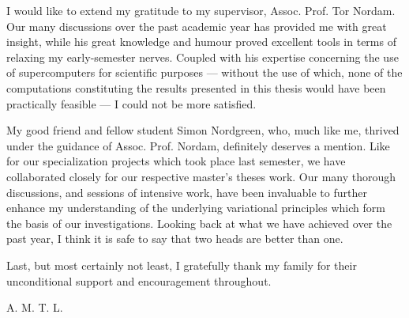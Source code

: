 I would like to extend my gratitude to my supervisor, Assoc. Prof. Tor Nordam.
Our many discussions over the past academic year has provided me with great
insight, while his great knowledge and humour proved excellent tools in terms
of relaxing my early-semester nerves. Coupled with his expertise concerning the
use of supercomputers for scientific purposes --- without the use of which,
none of the computations constituting the results presented in this thesis
would have been practically feasible --- I could not be more satisfied.

My good friend and fellow student Simon Nordgreen, who, much like me, thrived
under the guidance of Assoc. Prof. Nordam, definitely deserves a mention. Like
for our specialization projects which took place last semester, we have
collaborated closely for our respective master's theses work. Our many thorough
discussions, and sessions of intensive work, have been invaluable to further
enhance my understanding of the underlying variational principles which form
the basis of our investigations. Looking back at what we have achieved over the
past year, I think it is safe to say that two heads are better than one.


Last, but most certainly not least, I gratefully thank my family for their
unconditional support and encouragement throughout.

\begin{minipage}[t]{\textwidth}
\begin{flushright}
A. M. T. L.
\end{flushright}
\end{minipage}
